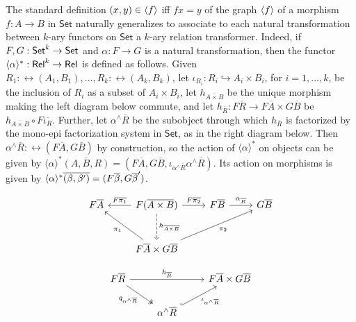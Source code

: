 \documentclass[runningheads]{llncs}
\newcommand{\set}{\mathsf{Set}}
\begin{document}
The standard definition $(x,y) \in \langle {f} \rangle$ iff $fx = y$ of the
graph $\langle {f} \rangle$ of a morphism $f : A \to B$ in $\set$ naturally
generalizes to associate to each natural transformation between
$k$-ary functors on $\set$ a $k$-ary relation transformer. Indeed, if
$F, G: \mathsf{Set}^k \to \mathsf{Set}$ and $\alpha : F \to G$ is a natural
transformation, then the functor $\langle {\alpha} \rangle^*: \mathsf{Rel}^k \to \mathsf{Rel}$
is defined as follows. Given $R_1 : \rel(A_1, B_1),...,R_k :
\rel(A_k,B_k)$, let $\iota_{R_i} : R_i \hookrightarrow A_i \times
B_i$, for $i = 1,...,k$, be the inclusion of $R_i$ as a subset of $A_i
\times B_i$, let $h_{\overline{A \times B}}$ be the unique morphism
making the left diagram below commute, and let $h_{\overline{R}} :
F\overline{R} \to F\overline{A} \times G\overline{B}$ be
$h_{\overline{A \times B}} \circ F\overline{\iota_R}$.  Further, let
$\alpha^\wedge\overline{R}$ be the subobject through which
$h_{\overline{R}}$ is factorized by the mono-epi factorization system
in $\set$, as in the right diagram below. Then
$\alpha^\wedge\overline{R} : \rel(F\overline{A}, G\overline{B})$ by
construction, so the action of $\langle \alpha \rangle^*$ on objects
can be given by $\langle \alpha \rangle^* \overline{(A,B,R)} =
(F\overline{A}, G\overline{B}, \iota_{\alpha^\wedge
  \overline{R}}\alpha^\wedge\overline{R})$. Its action on morphisms is
given by $\langle {\alpha} \rangle^*\overline{(\beta, \beta')} =
(F\overline\beta, G\overline\beta')$.

\begin{figure*}[ht]
\vspace*{-0.3in}
  \begin{minipage}[b]{0.25\linewidth}
{\footnotesize\[\begin{tikzcd}[row sep = large]
        F\overline{A}
        &F(\overline{A \times B})
        \ar[l, "{F\overline{\pi_1}}"']
        \ar[r, "{F\overline{\pi_2}}"]
        \ar[d, dashed, "{h_{\overline{A \times B}}}"]
        &F\overline{B}
        \ar[r, "{\alpha_{\ol{B}}}"]
        &G\overline{B} \\
        &F\overline{A} \times G\overline{B}
        \ar[ul, "{\pi_1}"] \ar[urr, "{\pi_2}"']
\end{tikzcd}\]}
  \end{minipage}
  \hspace*{1.4in}
  \begin{minipage}[b]{0.5\linewidth}
{\footnotesize\[\begin{tikzcd}
        F\overline{R}
        \ar[rr, "{h_{\overline{R}}}"]
        \ar[dr, twoheadrightarrow, "{q_{\alpha^\wedge\overline{R}}}"']
        &&F\overline{A} \times G\overline{B} \\
        &\alpha^\wedge\overline{R}
        \ar[ur, hookrightarrow, "{\iota_{\alpha^\wedge\overline{R}}}"']
\end{tikzcd}\]}
\end{minipage}\vspace*{-0.4in}
\end{figure*}
\end{document}
